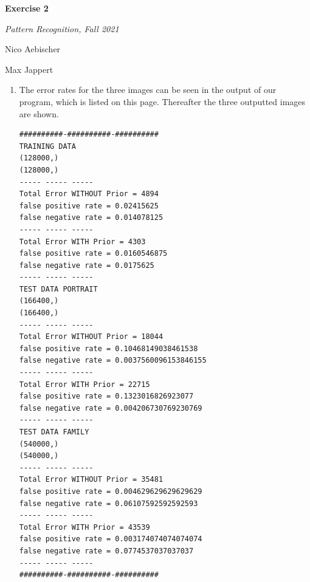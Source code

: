 \documentclass[11pt]{article}
\begin{document}
\begin{centering}
{\huge \bf Exercise 2} \smallskip

{\Large \em Pattern Recognition, Fall 2021

Nico Aebischer

Max Jappert

}
\end{centering}

\begin{enumerate}[1.]
	\item The error rates for the three images can be seen in the output of our program, which is listed on this page. Thereafter the three outputted images are shown.
	
	\begin{verbatim}
##########-##########-##########
TRAINING DATA
(128000,)
(128000,)
----- ----- -----
Total Error WITHOUT Prior = 4894
false positive rate = 0.02415625
false negative rate = 0.014078125
----- ----- -----
Total Error WITH Prior = 4303
false positive rate = 0.0160546875
false negative rate = 0.0175625
----- ----- -----
TEST DATA PORTRAIT
(166400,)
(166400,)
----- ----- -----
Total Error WITHOUT Prior = 18044
false positive rate = 0.10468149038461538
false negative rate = 0.0037560096153846155
----- ----- -----
Total Error WITH Prior = 22715
false positive rate = 0.1323016826923077
false negative rate = 0.004206730769230769
----- ----- -----
TEST DATA FAMILY
(540000,)
(540000,)
----- ----- -----
Total Error WITHOUT Prior = 35481
false positive rate = 0.004629629629629629
false negative rate = 0.06107592592592593
----- ----- -----
Total Error WITH Prior = 43539
false positive rate = 0.003174074074074074
false negative rate = 0.0774537037037037
----- ----- -----
##########-##########-##########

	\end{verbatim}
	

\end{enumerate}
\end{document}
